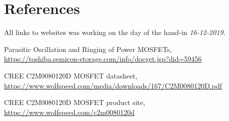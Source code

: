\section{References}
\label{sec:references}
All links to websites was working on the day of the hand-in \textit{16-12-2019}.


\begin{thebibliography}{9}

Parasitic Oscillation and Ringing of Power MOSFETs, \\
\url{https://toshiba.semicon-storage.com/info/docget.jsp?did=59456}

CREE C2M0080120D MOSFET datasheet, \\
\url{https://www.wolfspeed.com/media/downloads/167/C2M0080120D.pdf}

CREE C2M0080120D MOSFET product site, \\
\url{https://www.wolfspeed.com/c2m0080120d}

\end{thebibliography}




